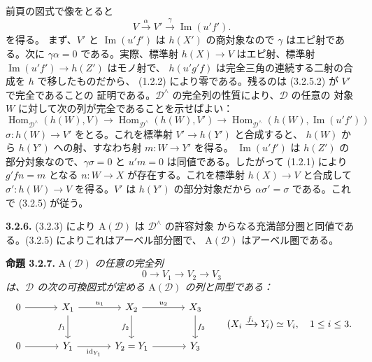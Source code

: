 \clearpage
{}%
\begingroup\small\setlength{\parskip}{0pt}\setlength{\emergencystretch}{1.5em}
前頁の図式で像をとると
\[
V\xrightarrow{\alpha}V'\xrightarrow{\gamma}\operatorname{Im}(u'f').
\tag{3.2.5.2}
\]
を得る。
まず、$V'$ と $\operatorname{Im}(u'f')$ は $h(X')$ の商対象なので
$\gamma$ はエピ射である。次に $\gamma\alpha=0$ である。実際、標準射
$h(X)\to V$ はエピ射、標準射 $\operatorname{Im}(u'f')\to h(Z')$ はモノ射で、
$h(u'g'f)$ は完全三角の連続する二射の合成を $h$ で移したものだから、
(1.2.2) により零である。残るのは (3.2.5.2) が $V'$ で完全であることの
証明である。$\mathcal D^\wedge$ の完全列の性質により、$\mathcal D$ の任意の
対象 $W$ に対して次の列が完全であることを示せばよい：
\[
\operatorname{Hom}_{\mathcal D^\wedge}(h(W),V)\longrightarrow
\operatorname{Hom}_{\mathcal D^\wedge}(h(W),V')\longrightarrow
\operatorname{Hom}_{\mathcal D^\wedge}(h(W),\operatorname{Im}(u'f'))
\]
$\sigma\colon h(W)\to V'$ をとる。これを標準射 $V'\to h(Y')$ と合成すると、
$h(W)$ から $h(Y')$ への射、すなわち射 $m\colon W\to Y'$ を得る。
$\operatorname{Im}(u'f')$ は $h(Z')$ の部分対象なので、$\gamma\sigma=0$ と
$u'm=0$ は同値である。したがって (1.2.1) により $g'fn=m$ となる
$n\colon W\to X$ が存在する。これを標準射 $h(X)\to V$ と合成して
$\sigma'\colon h(W)\to V$ を得る。$V'$ は $h(Y')$ の部分対象だから
$\alpha\sigma'=\sigma$ である。これで (3.2.5) が従う。

\medskip\noindent\textbf{3.2.6.}\quad
(3.2.3) により $\mathrm A(\mathcal D)$ は $\mathcal D^\wedge$ の許容対象
からなる充満部分圏と同値である。(3.2.5) によりこれはアーベル部分圏で、
$\mathrm A(\mathcal D)$ はアーベル圏である。

\medskip\noindent\textbf{命題 3.2.7.}\quad
\textit{$\mathrm A(\mathcal D)$ の任意の完全列}
\[
0\longrightarrow V_1\longrightarrow V_2\longrightarrow V_3
\]
\textit{は、$\mathcal D$ の次の可換図式が定める $\mathrm A(\mathcal D)$ の列と同型である：}
\[
\begin{tikzcd}[column sep=3.3em,row sep=2.4em]
0\arrow[r]&X_1\arrow[r,"u_1"]\arrow[d,"f_1"']&X_2\arrow[r,"u_2"]\arrow[d,"f_2"']&X_3\arrow[d,"f_3"]\\
0\arrow[r]&Y_1\arrow[r,"\operatorname{id}_{Y_1}"']&Y_2=Y_1\arrow[r]&Y_3
\end{tikzcd}
\qquad
(X_i\xrightarrow{f_i}Y_i)\simeq V_i,\quad1\leq i\leq3.
\]
\endgroup
